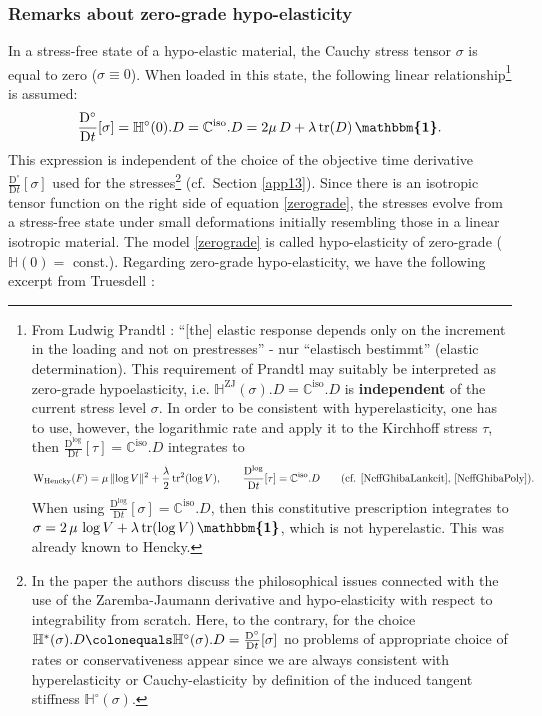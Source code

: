 \documentclass[10pt]{article}
\numberwithin{theoremCounter}{section}
\theoremstyle{plain}
\theoremstyle{definition}
\newcommand{\id}{{\boldsymbol{\mathbbm{1}}}}
\newcommand{\norm}[1]{\lVert #1 \rVert}
\newcommand{\DD}{\mathrm{D}}
\newcommand{\WW}{\mathrm{W}}
\DeclareMathOperator{\tr}{tr}
\DeclareMathOperator{\iso}{iso}
\DeclareMathOperator{\ZJ}{ZJ}
\def\tr{\textnormal{tr}}
\def\C{\mathbb{C}}
\def\H{\mathbb{H}}
\numberwithin{equation}{section}
\begin{document}
\begin{appendix}
\subsubsection{Remarks about zero-grade hypo-elasticity} \label{appendixzerograde}
%
In a stress-free state of a hypo-elastic material, the Cauchy stress tensor $\sigma$ is equal to zero ($\sigma \equiv 0$). When loaded in this state, the following linear relationship\footnote
{
From Ludwig Prandtl \cite{Prandtl}: ``[the] elastic response depends only on the increment in the loading and not on prestresses'' - nur ``elastisch bestimmt'' (elastic determination). This requirement of Prandtl may suitably be interpreted as zero-grade hypoelasticity, i.e. $\H^{\ZJ}(\sigma). D = \C^{\iso}.D$ is \textbf{independent} of the current stress level $\sigma$. In order to be consistent with hyperelasticity, one has to use, however, the logarithmic rate and apply it to the Kirchhoff stress $\tau$, then $\frac{\DD^{\log}}{\DD t}[\tau] = \C^{\iso}.D$ integrates to
	\begin{align}
	\WW_{\textnormal{Hencky}}(F) = \mu \, \norm{\log V}^2 + \frac{\lambda}{2} \, \tr^2(\log V), \qquad \frac{\DD^{\log}}{\DD t}[\tau] = \C^{\iso}.D \qquad \textnormal{(cf. \cite{NeffGhibaLankeit}, \cite{NeffGhibaPoly})}.
	\end{align}
When using $\frac{\DD^{\log}}{\DD t}[\sigma] = \C^{\iso}.D$, then this constitutive prescription integrates to $\sigma = 2 \, \mu \, \log V + \lambda \, \tr(\log V) \, \id$, which is not hyperelastic. This was already known to Hencky.
}
is assumed:
	\begin{align}
	\label{zerograde}
	\frac{\DD^{\circ}}{\DD t}[\sigma] = \H^{\circ}(0).D = \C^{\iso}.D = 2\mu \, D + \lambda \, \tr(D) \, \id.
	\end{align}
This expression is independent of the choice of the objective time derivative $\frac{\DD^{\circ}}{\DD t}[\sigma]$ used for the stresses\footnote
{
In the paper \cite{romano2014} the authors discuss the philosophical issues connected with the use of the Zaremba-Jaumann derivative and hypo-elasticity with respect to integrability from scratch. Here, to the contrary, for the choice $\H^*(\sigma).D \colonequals \H^{\circ}(\sigma).D = \frac{\DD^{\circ}}{\DD t}[\sigma]$ no problems of appropriate choice of rates or conservativeness appear since we are always consistent with hyperelasticity or Cauchy-elasticity by definition of the induced tangent stiffness $\H^{\circ}(\sigma)$.
} (cf.~Section \ref{app13}).
Since there is an isotropic tensor function on the right side of equation \eqref{zerograde}, the stresses evolve from a stress-free state under small deformations initially resembling those in a linear isotropic material. The model \eqref{zerograde} is called hypo-elasticity of zero-grade ($\H(0) =$ const.). Regarding zero-grade hypo-elasticity, we have the following excerpt from Truesdell \cite[p.123]{truesdell55hypo}: \\

\end{appendix}
\end{document}

